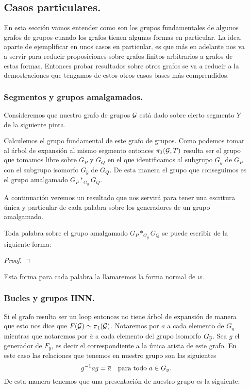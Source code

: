 \documentclass[tesis.tex]{subfiles}
\begin{document}
\subsection{Casos particulares.}

En esta sección vamos entender como son los grupos fundamentales de algunos grafos de grupos cuando los grafos tienen algunas formas en particular. 
La idea, aparte de ejemplificar en unos casos en particular, es que más en adelante nos va a servir para reducir proposiciones sobre grafos finitos arbitrarios a grafos de estas formas.
Entonces probar resultados sobre otros grafos se va a reducir a la demostraciones que tengamos de estos otros casos bases más comprendidos.

\subsubsection{Segmentos y grupos amalgamados.}
Consideremos que nuestro grafo de grupos ${\cal G}$ está dado sobre cierto segmento $Y$ de la siguiente pinta.

Calculemos el grupo fundamental de este grafo de grupos.
Como podemos tomar al árbol de expansión al mismo segmento entonces $\pi_1({\cal G}, T)$ resulta ser el grupo que tomamos libre sobre $G_P$ y $G_Q$ en el que identificamos al subgrupo $G_y$ de $G_P$ con el subgrupo isomorfo $G_{\overline y}$ de $G_Q$.
De esta manera el grupo que conseguimos es el grupo amalgamado $G_P \ast_{G_y} G_Q$. 

A continuación veremos un resultado que nos servirá para tener una escritura única y particular de cada palabra sobre los generadores de un grupo amalgamado.
\begin{prop}
	Toda palabra sobre el grupo amalgamado $G_P \ast_{G_y} G_Q$ se puede escribir de la siguiente forma:
	
\end{prop}
\begin{proof}
\end{proof}
 
Esta forma para cada palabra la llamaremos la forma normal de $w$.
\subsubsection{Bucles y grupos HNN.}

Si el grafo resulta ser un loop
entonces no tiene árbol de expansión de manera que esto nos dice que $F({\cal G}) \simeq \pi_1({\cal G})$.
Notaremos por $a$ a cada elemento de $G_y$ mientras que notaremos por $\overline{a}$ a cada elemento del grupo isomorfo $G_{\overline{y}}$.
Sea $g$ el generador de $F_{y}$, es decir el correspondiente a la única arista de este grafo. 
En este caso las relaciones que tenemos en nuestro grupo son las siguientes
\[
	g^{-1}ag = \overline{a}  \  \ \ \text{para todo} \ a \in G_y.
\]   
De esta manera tenemos que una presentación de nuestro grupo es la siguiente:
\end{document}

